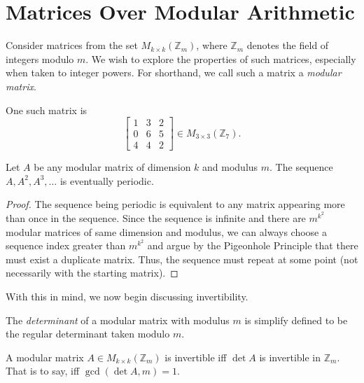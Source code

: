 \documentclass[a4paper, 12pt]{article}
\begin{document}
\section*{Matrices Over Modular Arithmetic}

Consider matrices from the set \( M_{k \times k}(\mathbb{Z}_m) \), where \( \mathbb{Z}_m \) denotes the field of integers modulo \( m \). We wish to explore the properties of such matrices, especially when taken to integer powers. For shorthand, we call such a matrix a \textit{modular matrix}.

\begin{example}
    One such matrix is
    \[
        \begin{bmatrix}
            1 & 3 & 2 \\
            0 & 6 & 5 \\
            4 & 4 & 2
        \end{bmatrix} \in M_{3 \times 3}(\mathbb{Z}_{7})
    .\]
\end{example}

\begin{theorem}
    Let \( A \) be any modular matrix of dimension \( k \) and modulus \( m \). The sequence \( A, A^2, A^3, \ldots \) is eventually periodic.
\end{theorem}

\begin{proof}
    The sequence being periodic is equivalent to any matrix appearing more than once in the sequence. Since the sequence is infinite and there are \( m^{k^2} \) modular matrices of same dimension and modulus, we can always choose a sequence index greater than \( m^{k^2} \) and argue by the Pigeonhole Principle that there must exist a duplicate matrix. Thus, the sequence must repeat at some point (not necessarily with the starting matrix).
\end{proof}

With this in mind, we now begin discussing invertibility.

\begin{definition}
    The \textit{determinant} of a modular matrix with modulus \( m \) is simplify defined to be the regular determinant taken modulo \( m \).
\end{definition}

\begin{theorem}
    A modular matrix \( A \in M_{k \times k}(\mathbb{Z}_m) \) is invertible iff \( \det A \) is invertible in \( \mathbb{Z}_m \). That is to say, iff \( \gcd{(\det A, m)} = 1 \).
\end{theorem}
\end{document}
